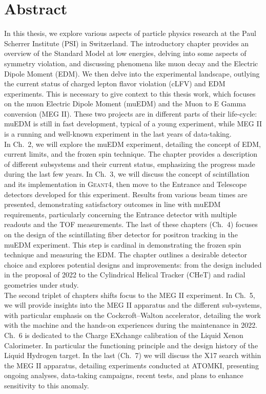 \thispagestyle{plain}			%
\setlength{\parskip}{0pt plus 1.0pt}
\section*{Abstract}
In this thesis, we explore various aspects of particle physics research at the Paul Scherrer Institute (PSI) in Switzerland.
The introductory chapter provides an overview of the Standard Model at low energies, delving into some aspects of symmetry violation, and discussing phenomena like muon decay and the Electric Dipole Moment (EDM).
We then delve into the experimental landscape, outlying the current status of charged lepton flavor violation (cLFV) and EDM experiments.
This is necessary to give context to this thesis work, which focuses on the muon Electric Dipole Moment (muEDM) and the Muon to E Gamma conversion (MEG II).
These two projects are in different parts of their life-cycle: muEDM is still in fast development, typical of a young experiment, while MEG II is a running and well-known experiment in the last years of data-taking.\\

\noindent
In Ch.~2, we will explore the muEDM experiment, detailing the concept of EDM, current limits, and the frozen spin technique. 
The chapter provides a description of different subsystems and their current status, emphasizing the progress made during the last few years. 
In Ch.~3, we will discuss the concept of scintillation and its implementation in \textsc{Geant4}, then move to the Entrance and Telescope detectors developed for this experiment. 
Results from various beam times are presented, demonstrating satisfactory outcomes in line with muEDM requirements, particularly concerning the Entrance detector with multiple readouts and the TOF measurements.
The last of these chapters (Ch.~4) focuses on the design of the scintillating fiber detector for positron tracking in the muEDM experiment. 
This step is cardinal in demonstrating the frozen spin technique and measuring the EDM. 
The chapter outlines a desirable detector choice and explores potential designs and improvements: from the design included in the proposal of 2022 to the Cylindrical Helical Tracker (CHeT) and radial geometries under study.\\

\noindent
The second triplet of chapters shifts focus to the MEG II experiment.
In Ch.~5, we will provide insights into the MEG II apparatus and the different sub-systems, with particular emphasis on the Cockcroft–Walton accelerator, detailing the work with the machine and the hands-on experiences during the maintenance in 2022.
Ch.~6 is dedicated to the Charge EXchange calibration of the Liquid Xenon Calorimeter. In particular the functioning principle and the design history of the Liquid Hydrogen target.
In the last (Ch.~7) we will discuss the X17 search within the MEG II apparatus, detailing experiments conducted at ATOMKI, presenting ongoing analyses, data-taking campaigns, recent tests, and plans to enhance sensitivity to this anomaly.\\

